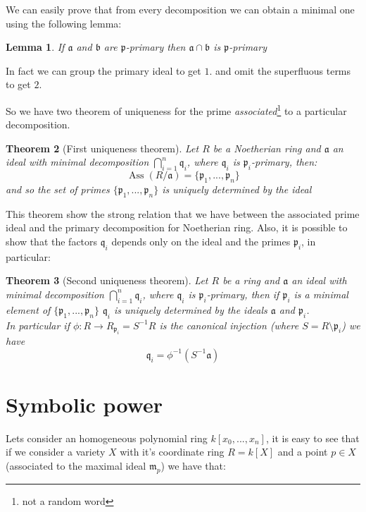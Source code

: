 \documentclass[notitlepage, a4]{book}
\theoremstyle{plain}
\newtheorem{teo}{Theorem}[section]
\newtheorem{lem}[teo]{Lemma}
\theoremstyle{remark}
\theoremstyle{definition}
\newcommand{\p}{\mathfrak{p}}
\newcommand{\q}{\mathfrak{q}}
\newcommand{\mm}{\mathfrak{m}}
\newcommand{\A}{\mathfrak{a}}
\newcommand{\B}{\mathfrak{b}}
\DeclareMathOperator{\Ass}{Ass}
\newcounter{que}
\begin{document}
We can easily prove that from every decomposition we can obtain a minimal one using the following lemma:

\begin{lem}
If $ \A $ and $ \B $ are $ \p $-primary then $ \A \cap \B $ is $ \p $-primary
\end{lem}

In fact we can group the primary ideal to get $ 1. $ and omit the superfluous terms to get $ 2. $

So we have two theorem of uniqueness for the prime \textit{associated}\footnote{not a random word} to a particular decomposition. 

\begin{teo}[First uniqueness theorem]
Let $ R $ be a Noetherian ring and $ \A $ an ideal with minimal decomposition $ \bigcap_{i=1}^n \q_i $, where $ \q_i $ is $ \p_i $-primary, then:
\[ \Ass(R/ \A) = \{ \p_1 , ... , \p_n \} \]
and so the set of primes $ \{ \p_1 , ... , \p_n \} $ is uniquely determined by the ideal

\end{teo}

This theorem show the strong relation that we have between the associated prime ideal and the primary decomposition for Noetherian ring. Also, it is possible to show that the factors $ \q_i $ depends only on the ideal and the primes $ \p_i $, in particular:

\begin{teo}[Second uniqueness theorem]
Let $ R $ be a ring and $ \A $ an ideal with minimal decomposition $ \bigcap_{i=1}^n \q_i $, where $ \q_i $ is $ \p_i $-primary, then if $ \p_i $ is a minimal element of $ \{ \p_1 , ... , \p_n \} $ $ \q_i $ is uniquely determined by the ideals $ \A $ and $ \p_i $.\\
In particular if $ \phi : R \to R_{\p_i} = S^{-1} R$ is the canonical injection (where $ S = R \setminus \p_i $) we have
\[ 
\q_i = \phi ^{-1} ( S^{-1} \A  )
\]

\end{teo}


\section{Symbolic power}

	Lets consider an homogeneous polynomial ring $ k[x_0 , ... , x_n] $, it is easy to see that if we consider a variety $ X $ with it's coordinate ring $ R = k[X] $ and a point $ p \in X $ (associated to the maximal ideal $ \mm_p $)  we have that:
	
\end{document}
